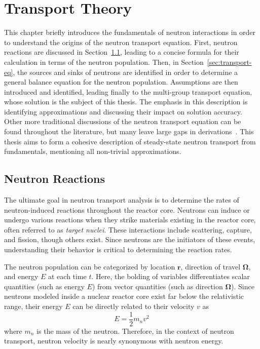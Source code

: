 \chapter{Transport Theory}
\label{chap:transport}

This chapter briefly introduces the fundamentals of neutron interactions in order to understand the origins of the neutron transport equation. First, neutron reactions are discussed in Section~\ref{sec:transport-fundamentals}, leading to a concise formula for their calculation in terms of the neutron population. Then, in Section~\ref{sec:transport-eq}, the sources and sinks of neutrons are identified in order to determine a general balance equation for the neutron population. Assumptions are then introduced and identified, leading finally to the multi-group transport equation, whose solution is the subject of this thesis. The emphasis in this description is identifying approximations and discussing their impact on solution accuracy. Other more traditional discussions of the neutron transport equation can be found throughout the literature, but many leave large gaps in derivations~\cite{henry, duderstadt, duderstadt-martin, bell1967transport, hebert2009applied}. This thesis aims to form a cohesive description of steady-state neutron transport from fundamentals, mentioning all non-trivial approximations.

\section{Neutron Reactions}
\label{sec:transport-fundamentals}

The ultimate goal in neutron transport analysis is to determine the rates of neutron-induced reactions throughout the reactor core. Neutrons can induce or undergo various reactions when they strike materials existing in the reactor core, often referred to as \textit{target nuclei}. These interactions include scattering, capture, and fission, though others exist. Since neutrons are the initiators of these events, understanding their behavior is critical to determining the reaction rates.

The neutron population can be categorized by location $\mathbf{r}$, direction of travel $\mathbf{\Omega}$, and energy $E$ at each time $t$. Here, the bolding of variables differentiates scalar quantities (such as energy $E$) from vector quantities (such as direction $\mathbf{\Omega}$). Since neutrons modeled inside a nuclear reactor core exist far below the relativistic range, their energy $E$ can be directly related to their velocity $v$ as
\begin{equation}
E = \frac{1}{2} m_n v^2
\end{equation}
where $m_n$ is the mass of the neutron. Therefore, in the context of neutron transport, neutron velocity is nearly synonymous with neutron energy.

